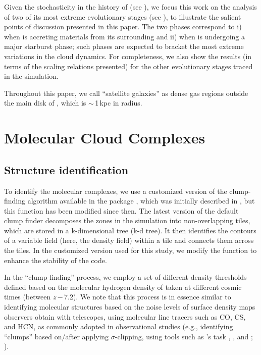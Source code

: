 \IfFileExists{emulateapjlegacy.cls}{\documentclass[iop]{emulateapjlegacy}}{\documentclass[iop]{emulateapj}}
\begin{document}
Given the stochasticity in the \SF history of \flower (see ), we focus this work on the analysis of two of its most extreme evolutionary 
stages (see ), to illustrate the salient points of discussion presented in this paper.
The two phases correspond to i) when \flower 
is accreting materials from its surrounding  and ii) when \flower is undergoing a major starburst phase; such phases are expected to bracket the most extreme variations in the cloud dynamics. 
For completeness, we also show the results (in terms of the scaling relations presented) for 
the other evolutionary stages traced in the simulation.

Throughout this paper, we call ``satellite galaxies'' as dense gas regions outside the main disk of \flower,
which is $\sim$\,1\,kpc in radius.

\section{Molecular Cloud Complexes}\label{sec:eqn}

\subsection{Structure identification}\label{sec:method}

To identify the molecular complexes, we use a customized version of the clump-finding algorithm available in the  package  \citep{Turk11a}, which was initially described in \citet{Smith09a}, but this function has been modified since then.
%
The latest version of the default  clump finder decomposes the zones in the simulation into non-overlapping tiles, which are stored in a k-dimensional tree (k-d tree). It then identifies the contours of a variable field (here, the density field) within a tile and connects them across the tiles. In the customized version used for this study, we modify the function to enhance the stability of the code.

In the ``clump-finding'' process, we employ a set of different density thresholds defined based on the molecular hydrogen density of \flower taken at different cosmic times (between $z$\,$-$\,7.2). We note that this process is in essence similar to identifying molecular structures based on the noise levels of surface density maps observers obtain with telescopes, using molecular line tracers such as CO, CS, and HCN, as commonly adopted in observational studies (e.g., identifying ``clumps'' based on/after applying $\sigma$-clipping, using tools such as 's task , , and ; \citealt{Williams94a, Oka01a, Rosolowsky06a, Rosolowsky08a}).
\end{document}
